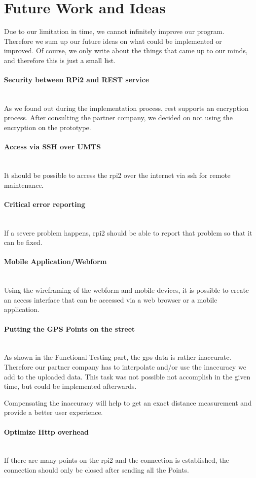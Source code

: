 \section{Future Work and Ideas}
Due to our limitation in time, we cannot infinitely improve our program. Therefore we sum up our future ideas on what could be implemented or improved. Of course, we only write about the things that came up to our minds, and therefore this is just a small list.
\paragraph{Security between RPi2 and REST service}\mbox{}\\
As we found out during the implementation process, \gls{rest} supports an encryption process. After consulting the partner company, we decided on not using the encryption on the prototype.
\paragraph{Access via SSH over UMTS}\mbox{}\\
It should be possible to access the \gls{rpi2} over the internet via \gls{ssh} for remote maintenance.
\paragraph{Critical error reporting}\mbox{}\\
If a severe problem happens, \gls{rpi2} should be able to report that problem so that it can be fixed.
\paragraph{Mobile Application/Webform}\mbox{}\\
Using the wireframing of the webform and mobile devices, it is possible to create an access interface that can be accessed via a web browser or a mobile application.
\paragraph{Putting the GPS Points on the street}\mbox{}\\
As shown in the Functional Testing part, the \gls{gps} data is rather inaccurate. Therefore our partner company has to interpolate and/or use the inaccuracy we add to the uploaded data. This task was not possible not accomplish in the given time, but could be implemented afterwards.

Compensating the inaccuracy will help to get an exact distance measurement and provide a better user experience.
\paragraph{Optimize Http overhead}\mbox{}\\
If there are many points on the \gls{rpi2}  and the connection is established, the connection should only be closed after sending all the Points.
